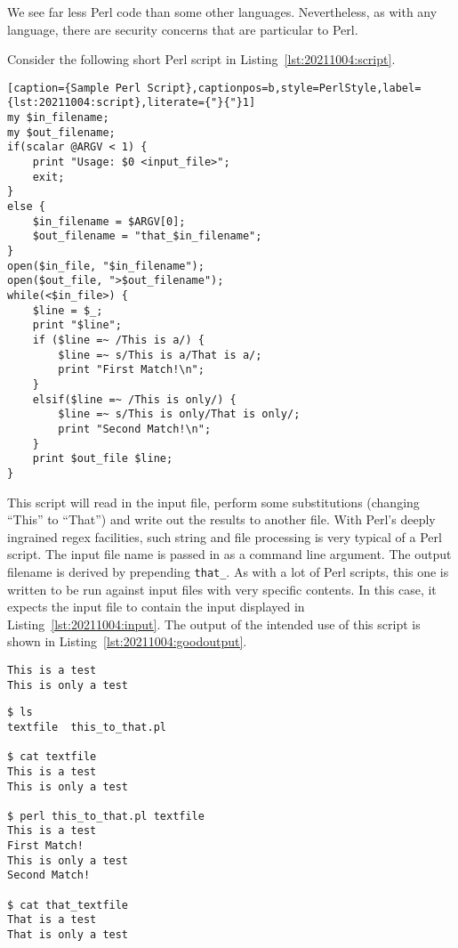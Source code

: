 We see far less Perl code than some other languages. Nevertheless, as with any language, there are security concerns that are particular to Perl.

Consider the following short Perl script in Listing~\ref{lst:20211004:script}.

\begin{lstlisting}[caption={Sample Perl Script},captionpos=b,style=PerlStyle,label={lst:20211004:script},literate={"}{"}1]
my $in_filename;
my $out_filename;
if(scalar @ARGV < 1) {
	print "Usage: $0 <input_file>";
	exit;
}
else {
	$in_filename = $ARGV[0];
	$out_filename = "that_$in_filename";
}
open($in_file, "$in_filename");
open($out_file, ">$out_filename");
while(<$in_file>) {
	$line = $_;
	print "$line";
	if ($line =~ /This is a/) {
		$line =~ s/This is a/That is a/;
		print "First Match!\n";
	}
	elsif($line =~ /This is only/) {
		$line =~ s/This is only/That is only/;
		print "Second Match!\n";
	}
	print $out_file $line;
}
\end{lstlisting}

This script will read in the input file, perform some substitutions (changing ``This'' to ``That'') and write out the results to another file. With Perl's deeply ingrained regex facilities, such string and file processing is very typical of a Perl script. The input file name is passed in as a command line argument. The output filename is derived by prepending \texttt{that\_}. As with a lot of Perl scripts, this one is written to be run against input files with very specific contents. In this case, it expects the input file to contain the input displayed in Listing~\ref{lst:20211004:input}. The output of the intended use of this script is shown in Listing~\ref{lst:20211004:goodoutput}.

\begin{lstlisting}[caption={Sample Input},captionpos=b,style=BashStyle,label={lst:20211004:input}]
This is a test
This is only a test
\end{lstlisting}

\begin{lstlisting}[caption={Sample Execution},captionpos=b,style=BashStyle,label={lst:20211004:goodoutput}]
$ ls
textfile  this_to_that.pl

$ cat textfile
This is a test
This is only a test

$ perl this_to_that.pl textfile
This is a test
First Match!
This is only a test
Second Match!

$ cat that_textfile
That is a test
That is only a test
\end{lstlisting}

